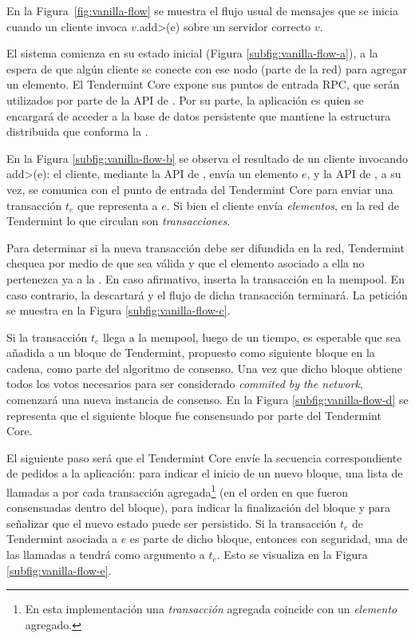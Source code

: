 En la Figura~\ref{fig:vanilla-flow} se muestra el flujo usual de mensajes que se inicia
cuando un cliente invoca $v.$\<add>(e) sobre un servidor correcto $v$.
%

El sistema comienza en su estado inicial (Figura \ref{subfig:vanilla-flow-a}), a la espera de que algún cliente
se conecte con ese nodo (parte de la red) para agregar un elemento.
El Tendermint Core expone sus puntos de entrada RPC, que serán utilizados por parte de la API de
\setchain. Por su parte, la aplicación es quien se encargará de acceder a la base de datos persistente que
mantiene la estructura distribuida que conforma la \setchain.
%

En la Figura \ref{subfig:vanilla-flow-b} se observa el resultado de un cliente invocando \<add>(e): el cliente, mediante
la API de \setchain, envía un elemento $e$, y la API de \setchain, a su vez, se comunica con el
punto de entrada del Tendermint Core para enviar una transacción $t_e$ que representa a $e$.
Si bien el cliente envía \textit{elementos}, en la red de Tendermint
lo que circulan son \textit{transacciones}.
%

Para determinar si la nueva transacción debe ser difundida en la red, Tendermint chequea por medio de \CheckTx
que sea válida y que el elemento asociado a ella no pertenezca ya a la \setchain.
En caso afirmativo, inserta la transacción en la mempool.
En caso contrario, la descartará y el flujo de dicha transacción terminará.
La petición \CheckTx se muestra en la Figura \ref{subfig:vanilla-flow-c}.

%
Si la transacción $t_e$ llega a la mempool, luego de un tiempo, es esperable que sea añadida a un
bloque de Tendermint, propuesto como siguiente bloque en la cadena, como parte del algoritmo de
consenso.
Una vez que dicho bloque obtiene todos los votos necesarios para ser considerado
\textit{commited by the network}, comenzará una nueva instancia de consenso. En la Figura \ref{subfig:vanilla-flow-d}
se representa que el siguiente bloque fue consensuado por parte del Tendermint Core.

%
El siguiente paso será que el Tendermint Core envíe
la secuencia correspondiente de pedidos a la aplicación: \BeginBlock para indicar el inicio de
un nuevo bloque,
una lista de llamadas a \DeliverTx por cada transacción agregada\footnote{En esta implementación
una \textit{transacción} agregada coincide con un \textit{elemento} agregado.} (en el orden en que fueron
consensuadas dentro del bloque),
\EndBlock para indicar la finalización del bloque y \Commit para señalizar que el nuevo estado
puede ser persistido.
%
Si la transacción $t_e$ de Tendermint asociada a $e$ es parte de dicho bloque,
entonces con seguridad, una de las llamadas a \DeliverTx tendrá como argumento a $t_e$.
Esto se visualiza en la Figura \ref{subfig:vanilla-flow-e}.


